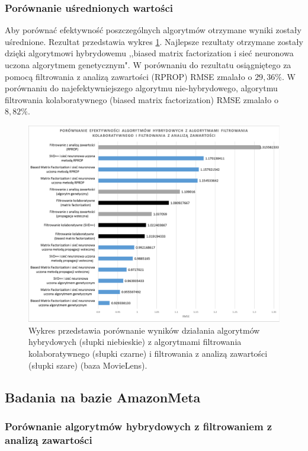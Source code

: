 \documentclass[twoside]{iisthesis}
\begin{document}
		\subsubsection{Porównanie uśrednionych wartości}
		
		Aby porównać efektywność poszczególnych algorytmów otrzymane wyniki zostały uśrednione. Rezultat przedstawia wykres \ref{fig:ml_exphybrid}. Najlepsze rezultaty otrzymane zostały dzięki algorytmowi hybrydowemu ,,biased matrix factorization i sieć neuronowa uczona algorytmem genetycznym". W porównaniu do rezultatu osiągniętego za pomocą filtrowania z analizą zawartości (RPROP) RMSE zmalało o  $29,36\%$. W porównaniu do najefektywniejszego algorytmu nie-hybrydowego, algorytmu filtrowania kolaboratywnego (biased matrix factorization) RMSE zmalało o $8,82\%$.
		
		\begin{figure}
			\centering
			\includegraphics[width=1\textwidth]{ml_exphybrid}	
			\caption{Wykres przedstawia porównanie wyników działania algorytmów hybrydowych (słupki niebieskie) z algorytmami filtrowania kolaboratywnego (słupki czarne) i filtrowania z analizą zawartości (słupki szare) (baza MovieLens).}
			\label{fig:ml_exphybrid}
		\end{figure}
		
		\subsection{Badania na bazie AmazonMeta}
				
		\subsubsection{Porównanie algorytmów hybrydowych z filtrowaniem z analizą zawartości}
		
\end{document}
